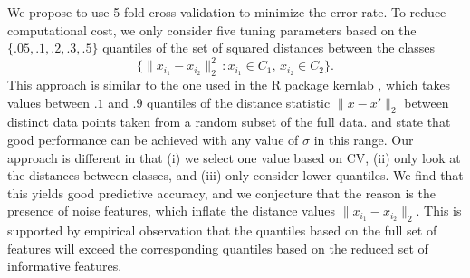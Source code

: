 \documentclass[twoside, onecolumn]{article}
\begin{document}
We propose to use 5-fold cross-validation to minimize the error rate. To reduce computational cost, we only consider five tuning parameters based on the $\{.05, .1, .2, .3,.5\}$ quantiles of the set of squared distances between the classes
$$
\{\|x_{i_1}-x_{i_2}\|_2^2\,:x_{i_1} \in C_1,\,x_{i_2}\in C_2\}.
$$
This approach is similar to the one used in the R package \textsf{kernlab} \cite{karatzoglou2004kernlab}, which takes values between $.1$ and $.9$ quantiles of the distance statistic $\|x-x'\|_2$ between distinct data points taken from a random subset of the full data. \cite{caputo2002appearance} and \cite{karatzoglou2004kernlab} state that good performance can be achieved with any value of $\sigma$ in this range. Our approach is different in that (i) we select one value based on CV, (ii) only look at the distances between classes, and (iii) only consider lower quantiles.
 We find that this yields good predictive accuracy, and we conjecture that the reason is the presence of noise features, which inflate the distance values $\|x_{i_1}-x_{i_2}\|_2$.  This is supported by empirical observation that the quantiles based on the full set of features will exceed the corresponding quantiles based on the reduced set of informative features.

\end{document}

